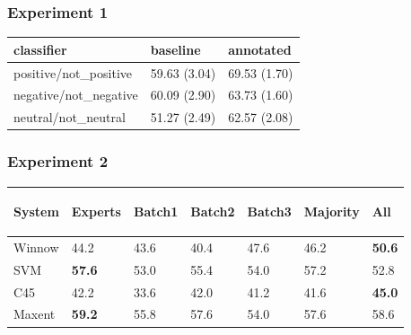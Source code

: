 \documentclass[10pt]{beamer}
\begin{document}
\begin{frame}
  \frametitle{Experiment 1}

\begin{center}
\begin{tabular}{|l|l|l|}
\hline
classifier &baseline &annotated \\ 
\hline
positive/not\_positive &59.63 (3.04) &69.53 (1.70) \\ 
\hline
negative/not\_negative &60.09 (2.90) &63.73 (1.60) \\ 
\hline
neutral/not\_neutral &51.27 (2.49) &62.57 (2.08) \\ 
\hline
\end{tabular}
\end{center}

\end{frame}

\begin{frame}
  \frametitle{Experiment 2}


\begin{center}
\begin{small}
\begin{tabular}{|l|l|l|l|l|l|l|} \hline
 System & 
 {\begin{sideways}\parbox{2cm}{\centering Experts}\end{sideways}} &
 {\begin{sideways}\parbox{2cm}{\centering Batch1}\end{sideways}} &
 {\begin{sideways}\parbox{2cm}{\centering Batch2}\end{sideways}} &
 {\begin{sideways}\parbox{2cm}{\centering Batch3}\end{sideways}} &
 {\begin{sideways}\parbox{2cm}{\centering Majority}\end{sideways}} &
 {\begin{sideways}\parbox{2cm}{\centering All}\end{sideways}} \\ \hline
 Winnow & 44.2 & 43.6 & 40.4 & 47.6 & 46.2 & \textbf{50.6} \\ \hline
 SVM & \textbf{57.6} & 53.0 & 55.4 & 54.0 & 57.2 & 52.8 \\ \hline
 C45 & 42.2 & 33.6 & 42.0 & 41.2 & 41.6 & \textbf{45.0} \\ \hline
 Maxent & \textbf{59.2} & 55.8 & 57.6 & 54.0 & 57.6 & 58.6 \\ \hline
\end{tabular}
\end{small}
\end{center}
\end{frame}
\end{document}
